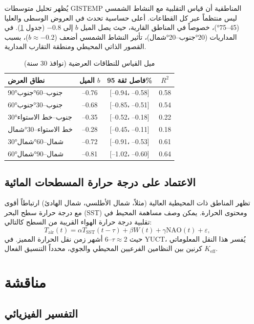 \documentclass[11pt,a4paper]{article}
\newcommand{\Keff}{K_{\mathrm{eff}}}
\begin{document}
	يُظهر تحليل متوسطات GISTEMP المناطقية أن قياس التقلبية مع النشاط الشمسي ليس منتظماً عبر كل القطاعات. أعلى حساسية تحدث في العروض الوسطى والعليا (45–75°)، خصوصاً في المناطق القارية، حيث يصل الميل \(b\) إلى \(-0.8\) (جدول \ref{tab:zonal}). في المداريات (20°جنوب–20°شمال)، تأثير النشاط الشمسي أضعف (\(b \approx -0.2\))، بسبب القصور الذاتي المحيطي ومنطقة التقارب المدارية.
	
	\begin{table}[htbp]
		\centering
		\caption{ميل القياس للنطاقات العرضية (نوافذ 30 سنة)}
		\label{tab:zonal}
		\begin{tabular}{@{}lccc@{}}
			\toprule
			نطاق العرض & الميل \(b\) & فاصل ثقة 95\% & \(R^2\) \\
			\midrule
			90°جنوب–60°جنوب & –0.76 & [–0.94، –0.58] & 0.58 \\
			60°جنوب–30°جنوب & –0.68 & [–0.85، –0.51] & 0.54 \\
			30°جنوب–خط الاستواء & –0.35 & [–0.52، –0.18] & 0.22 \\
			خط الاستواء–30°شمال & –0.28 & [–0.45، –0.11] & 0.18 \\
			30°شمال–60°شمال & –0.72 & [–0.91، –0.53] & 0.61 \\
			60°شمال–90°شمال & –0.81 & [–1.02، –0.60] & 0.64 \\
			\bottomrule
		\end{tabular}
	\end{table}
	
	\subsection{الاعتماد على درجة حرارة المسطحات المائية}
	
	تظهر المناطق ذات المحيطية العالية (مثلاً، شمال الأطلسي، شمال الهادئ) ارتباطاً أقوى مع درجة حرارة سطح البحر (SST) ومحتوى الحرارة. يمكن وصف مساهمة المحيط في تقلبية درجة حرارة الهواء القريبة من السطح كالتالي:
	\[
	T_{\text{air}}(t) = \alpha T_{\text{SST}}(t-\tau) + \beta W(t) + \gamma \text{NAO}(t) + \varepsilon,
	\]
	حيث \(\tau \approx 2\)–6 أشهر زمن نقل الحرارة المميز. في YUCT، يُفسر هذا النقل المعلوماتي كرنين بين النظامين الفرعيين المحيطي والجوي، محدداً التنسيق الفعال \(\Keff\).
	
	\section{مناقشة}
	
	\subsection{التفسير الفيزيائي}
	
\end{document}
